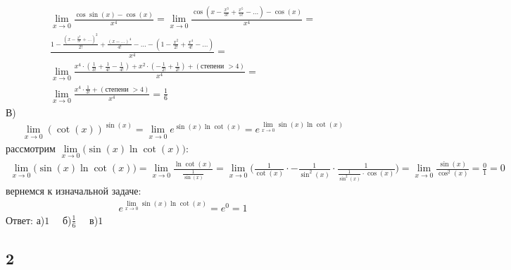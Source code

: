 		\begin{gather*}
			\lim\limits_{x \to 0} \frac{\cos\sin(x) - \cos(x)}{x^4} = 
			\lim\limits_{x \to 0} \frac{\cos(x - \frac{x^3}{3!} + \frac{x^5}{5!} - \ldots) - \cos(x)}{x^4} = \\
			\frac{1 - \frac{(x - \frac{x^3}{3!} + \ldots)^2}{2!} + \frac{(x - \ldots)^4}{4!} - \ldots - (1 - \frac{x^2}{2!} + \frac{x^4}{4!} - \ldots)}{x^4} = \\
			\lim\limits_{x \to 0} \frac{x^4 \cdot (\frac{1}{3!} + \frac{1}{4!} - \frac{1}{4!}) + x^2 \cdot (-\frac{1}{2!} + \frac{1}{2!}) + (\text{степени $>4$})}{x^4} = \\
			\lim\limits_{x \to 0} \frac{x^4 \cdot \frac{1}{3!} + (\text{степени $>4$})}{x^4} = 
			\frac{1}{6}
		\end{gather*}
		В)\\
		\begin{gather*}
			\lim\limits_{x \to 0} (\cot(x))^{\sin(x)} = 
			\lim\limits_{x \to 0} e^{\sin(x) \ln \cot(x)} = 
			e^{\lim\limits_{x \to 0} \sin(x) \ln \cot(x)}
		\end{gather*}
	 	рассмотрим $\lim\limits_{x \to 0} \bigg( \sin(x) \ln \cot(x) \bigg)$:
	 	\begin{gather*}
	 		\lim\limits_{x \to 0} \bigg( \sin(x) \ln \cot(x) \bigg) = 
	 		\lim\limits_{x \to 0} \frac{\ln \cot(x)}{\frac{1}{\sin(x)}} =
	 		\lim\limits_{x \to 0} \bigg( \frac{1}{\cot(x)} \cdot -\frac{1}{\sin^2(x)} \cdot \frac{1}{\frac{1}{\sin^2(x)} \cdot \cos(x)} \bigg) = 
	 		\lim\limits_{x \to 0} \frac{\sin(x)}{\cos^2(x)} = 
	 		\frac{0}{1} = 
	 		0
	 	\end{gather*}
		вернемся к изначальной задаче:
		\begin{gather*}
			e^{\lim\limits_{x \to 0} \sin(x) \ln \cot(x)} = e^{0} = 1
		\end{gather*}
		Ответ: а)$1\quad$ б)$\frac{1}{6}\quad$ в)$1$
		
		\subsection{2}
		
